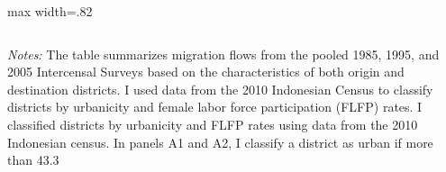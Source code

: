 \begin{center}
\begin{adjustbox}{max width=.82\textwidth}
\begin{threeparttable}[!h]
\begin{tabular}{lccc}
\bottomrule
\bottomrule
\end{tabular}
\begin{tablenotes}
\item \footnotesize \textit{Notes:} The table summarizes migration flows from the pooled 1985, 1995, and 2005 Intercensal Surveys based on the characteristics of both origin and destination districts. I used data from the 2010 Indonesian Census to classify districts by urbanicity and female labor force participation (FLFP) rates. I classified districts by urbanicity and FLFP rates using data from the 2010 Indonesian census. In panels A1 and A2, I classify a district as urban if more than 43.3%
\end{tablenotes}
\end{threeparttable}
\end{adjustbox}
\end{center}
